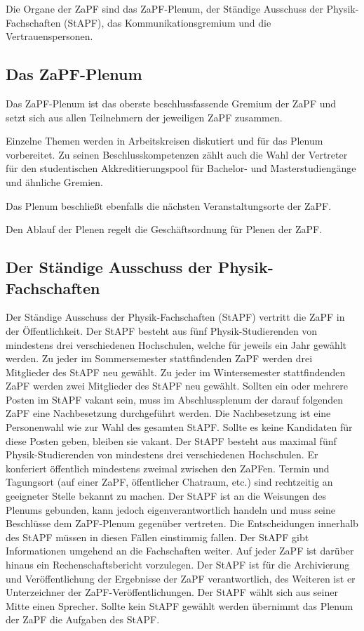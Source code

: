 \documentclass[draft,12pt,oneside]{scrreprt}
\begin{document}
Die Organe der ZaPF sind das ZaPF-Plenum, der Ständige Ausschuss der
Physik-Fachschaften (StAPF), das Kommunikationsgremium und die Vertrauenspersonen.

\subsection{Das ZaPF-Plenum}

Das ZaPF-Plenum ist das oberste beschlussfassende Gremium der ZaPF und setzt
sich aus allen Teilnehmern der jeweiligen ZaPF zusammen.

Einzelne Themen werden in Arbeitskreisen diskutiert und für das Plenum vorbereitet.
Zu seinen Beschlusskompetenzen zählt auch die Wahl der Vertreter für den
studentischen Akkreditierungspool für Bachelor- und Masterstudiengänge und
ähnliche Gremien.

Das Plenum beschließt ebenfalls die nächsten Veranstaltungsorte der ZaPF.

Den Ablauf der Plenen regelt die Geschäftsordnung für Plenen der ZaPF.

\subsection{Der Ständige Ausschuss der Physik-Fachschaften}

Der Ständige Ausschuss der Physik-Fachschaften (StAPF) vertritt die ZaPF in der
Öffentlichkeit.
Der StAPF besteht aus fünf Physik-Studierenden von mindestens drei verschiedenen
Hochschulen, welche für jeweils ein Jahr gewählt werden.
Zu jeder im Sommersemester stattfindenden ZaPF werden drei Mitglieder des StAPF
neu gewählt.
Zu jeder im Wintersemester stattfindenden ZaPF werden zwei Mitglieder des StAPF
neu gewählt.
Sollten ein oder mehrere Posten im StAPF vakant sein, muss im Abschlussplenum der
darauf folgenden ZaPF eine Nachbesetzung durchgeführt werden.
Die Nachbesetzung ist eine Personenwahl wie zur Wahl des gesamten StAPF.
Sollte es keine Kandidaten für diese Posten geben, bleiben sie vakant.
Der StAPF besteht aus maximal fünf Physik-Studierenden von mindestens drei
verschiedenen Hochschulen.
Er konferiert öffentlich mindestens zweimal zwischen den ZaPFen.
Termin und Tagungsort (auf einer ZaPF, öffentlicher Chatraum, etc.) sind
rechtzeitig an geeigneter Stelle bekannt zu machen.
Der StAPF ist an die Weisungen des Plenums gebunden, kann jedoch
eigenverantwortlich handeln und muss seine Beschlüsse dem ZaPF-Plenum gegenüber
vertreten.
Die Entscheidungen innerhalb des StAPF müssen in diesen Fällen einstimmig fallen.
Der StAPF gibt Informationen umgehend an die Fachschaften weiter.
Auf jeder ZaPF ist darüber hinaus ein Rechenschaftsbericht vorzulegen.
Der StAPF ist für die Archivierung und Veröffentlichung der Ergebnisse der ZaPF
verantwortlich, des Weiteren ist er Unterzeichner der ZaPF-Veröffentlichungen.
Der StAPF wählt sich aus seiner Mitte einen Sprecher.
Sollte kein StAPF gewählt werden übernimmt das Plenum der ZaPF die Aufgaben des StAPF.
\end{document}
